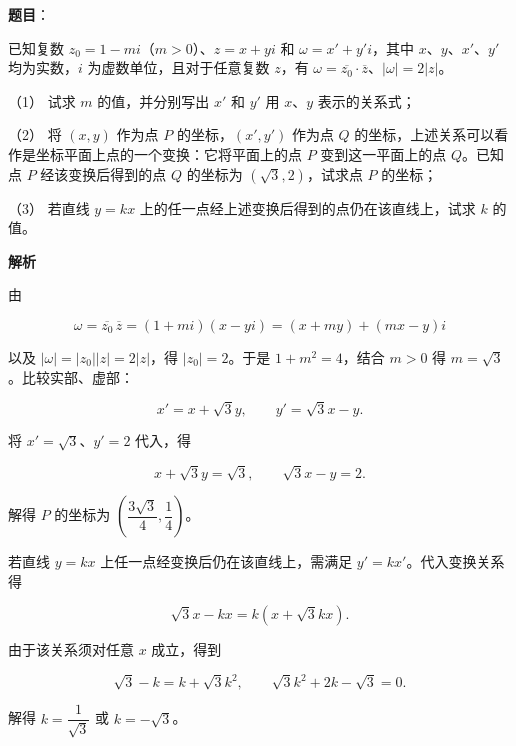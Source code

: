 \begin{answer}

\textbf{题目}：

已知复数 $z_0=1-mi$（$m>0$）、$z=x+yi$ 和 $\omega=x'+y'i$，其中 $x$、$y$、$x'$、$y'$ 均为实数，$i$ 为虚数单位，且对于任意复数 $z$，有 $\omega=\overline{z_0}\cdot\overline{z}$、$|\omega|=2|z|$。

（1） 试求 $m$ 的值，并分别写出 $x'$ 和 $y'$ 用 $x$、$y$ 表示的关系式；

（2） 将 $(x,y)$ 作为点 $P$ 的坐标，$(x',y')$ 作为点 $Q$ 的坐标，上述关系可以看作是坐标平面上点的一个变换：它将平面上的点 $P$ 变到这一平面上的点 $Q$。已知点 $P$ 经该变换后得到的点 $Q$ 的坐标为 $(\sqrt{3},2)$，试求点 $P$ 的坐标；

（3） 若直线 $y=kx$ 上的任一点经上述变换后得到的点仍在该直线上，试求 $k$ 的值。

\textbf{解析}

由

\nopagebreak[4]
\[
\omega=\overline{z_0}\,\overline z=(1+mi)(x-yi)
=(x+my)+(mx-y)i
\]

以及 $|\omega|=|z_0||z|=2|z|$，得 $|z_0|=2$。于是 $1+m^2=4$，结合 $m>0$ 得 $m=\sqrt3$。比较实部、虚部：

\nopagebreak[4]
\[
x'=x+\sqrt3y,\qquad y'=\sqrt3x-y.
\]

将 $x'=\sqrt3$、$y'=2$ 代入，得

\nopagebreak[4]
\[
x+\sqrt3y=\sqrt3,\qquad \sqrt3x-y=2.
\]

解得 $P$ 的坐标为 $\left(\dfrac{3\sqrt3}{4},\dfrac14\right)$。

若直线 $y=kx$ 上任一点经变换后仍在该直线上，需满足 $y'=kx'$。代入变换关系得

\nopagebreak[4]
\[
\sqrt3x-kx=k(x+\sqrt3kx).
\]

由于该关系须对任意 $x$ 成立，得到

\nopagebreak[4]
\[
\sqrt3-k=k+\sqrt3k^2,
\qquad
\sqrt3k^2+2k-\sqrt3=0.
\]

解得 $k=\dfrac1{\sqrt3}$ 或 $k=-\sqrt3$。




\end{answer}